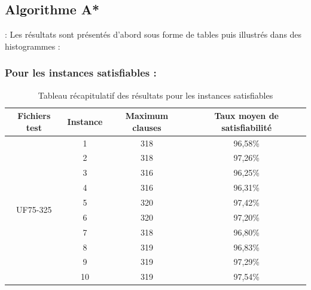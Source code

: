 

\newpage
\subsection{Algorithme A*} :
Les résultats sont présentés d'abord sous forme de tables puis illustrés dans des histogrammes : 
\subsubsection{Pour les instances satisfiables :}
\begin{table}[H]
	\centering
	\begin{tabular}{|c|c|c|c|}
		\hline
		Fichiers test              & Instance & Maximum clauses & Taux moyen de satisfiabilité \\ \hline
		\multirow{10}{*}{UF75-325} & 1        & 318             & 96,58\%                      \\ \cline{2-4} 
		& 2        & 318             & 97,26\%                      \\ \cline{2-4} 
		& 3        & 316             & 96,25\%                      \\ \cline{2-4} 
		& 4        & 316             & 96,31\%                      \\ \cline{2-4} 
		& 5        & 320             & 97,42\%                      \\ \cline{2-4} 
		& 6        & 320             & 97,20\%                      \\ \cline{2-4} 
		& 7        & 318             & 96,80\%                      \\ \cline{2-4} 
		& 8        & 319             & 96,83\%                      \\ \cline{2-4} 
		& 9        & 319             & 97,29\%                      \\ \cline{2-4} 
		& 10       & 319             & 97,54\%                      \\ \hline
	\end{tabular}
	\caption{Tableau récapitulatif des résultats pour les instances satisfiables}
	\label{table:Tab_Astar_Sat}
\end{table}
